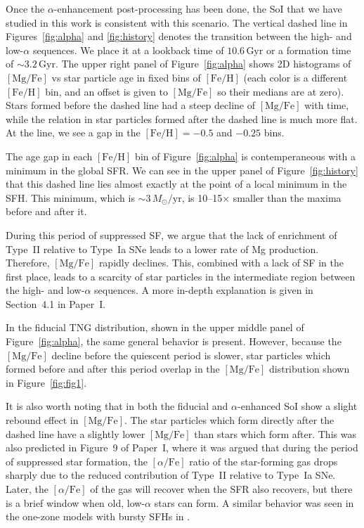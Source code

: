 \documentclass[twocolumn]{aastex631}
\newcommand{\Msun}{\ensuremath{M_{\odot}}}
\newcommand{\Gyr}{\ensuremath{\textrm{Gyr}}}
\newcommand{\FeH}{\ensuremath{[\textrm{Fe}/\textrm{H}]}}
\newcommand{\MgFe}{\ensuremath{[\textrm{Mg}/\textrm{Fe}]}}
\newcommand{\alphaFe}{\ensuremath{[\alpha/\textrm{Fe}]}}
\newcommand{\Msunyr}{\ensuremath{\Msun/\textrm{yr}}}
\begin{document}
Once the $\alpha$-enhancement post-processing has been done, the SoI that we have studied in this work is consistent with this scenario. The vertical dashed line in Figures~\ref{fig:alpha} and \ref{fig:history} denotes the transition between the high- and low-$\alpha$ sequences. We place it at a lookback time of $10.6\,\Gyr$ or a formation time of $\sim3.2\,\Gyr$. The upper right panel of Figure~\ref{fig:alpha} shows 2D histograms of \MgFe{} vs star particle age in fixed bins of \FeH{} (each color is a different \FeH{} bin, and an offset is given to \MgFe{} so their medians are at zero). Stars formed before the dashed line had a steep decline of \MgFe{} with time, while the relation in star particles formed after the dashed line is much more flat. At the line, we see a gap in the $\FeH=-0.5$ and $-0.25$ bins.

The age gap in each \FeH{} bin of Figure~\ref{fig:alpha} is contemperaneous with a minimum in the global SFR. We can see in the upper panel of Figure~\ref{fig:history} that this dashed line lies almost exactly at the point of a local minimum in the SFH. This minimum, which is $\sim3\,\Msunyr$, is 10--15$\times$ smaller than the maxima before and after it.

During this period of suppressed SF, we argue that the lack of enrichment of Type~II relative to Type~Ia SNe leads to a lower rate of Mg production. Therefore, \MgFe{} rapidly declines. This, combined with a lack of SF in the first place, leads to a scarcity of star particles in the intermediate region between the high- and low-$\alpha$ sequences. A more in-depth explanation is given in Section~4.1 in Paper~I.

In the fiducial TNG distribution, shown in the upper middle panel of Figure~\ref{fig:alpha}, the same general behavior is present. However, because the \MgFe{} decline before the quiescent period is slower, star particles which formed before and after this period overlap in the \MgFe{} distribution shown in Figure~\ref{fig:fig1}.

It is also worth noting that in both the fiducial and $\alpha$-enhanced SoI show a slight rebound effect in \MgFe{}. The star particles which form directly after the dashed line have a slightly lower \MgFe{} than stars which form after. This was also predicted in Figure~9 of Paper~I, where it was argued that during the period of suppressed star formation, the \alphaFe{} ratio of the star-forming gas drops sharply due to the reduced contribution of Type~II relative to Type~Ia SNe. Later, the \alphaFe{} of the gas will recover when the SFR also recovers, but there is a brief window when old, low-$\alpha$ stars can form. A similar behavior was seen in the one-zone models with bursty SFHs in \citet{2020MNRAS.498.1364J}.
\end{document}
